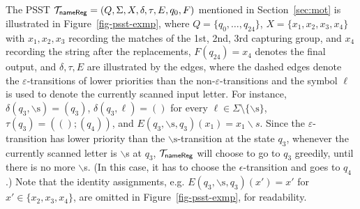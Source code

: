 \begin{example}
The PSST $\mathcal{T}_{\sf nameReg}=(Q, \Sigma, X, \delta, \tau, E,  q_{0}, F)$ mentioned in Section~\ref{sec:mot} is illustrated in Figure~\ref{fig-psst-exmp}, where $Q = \{q_0, \dots, q_{24}\}$, $X= \{x_1, x_2, x_3, x_4\}$ with $x_1, x_2, x_3$ recording the matches of the 1st, 2nd, 3rd capturing group, and $x_4$ recording the string after the replacements, $F(q_{24}) = x_4$ denotes the final output, and $\delta, \tau, E$ are illustrated by the edges, where the dashed edges denote the $\varepsilon$-transitions of lower priorities than the non-$\varepsilon$-transitions and the symbol $\ell$ is used to denote the currently scanned input letter. For instance, $\delta(q_3, \backslash\mbox{s}) = (q_3)$, $\delta(q_3, \ell) = ()$ for every $\ell \in \Sigma \setminus \{\backslash\mbox{s}\}$, $\tau(q_3) = ((); (q_4))$, and $E(q_3, \backslash\mbox{s}, q_3)(x_1) = x_1 \backslash s$. Since the $\varepsilon$-transition has lower priority than the $\backslash\mbox{s}$-transition at the state $q_3$, whenever the currently scanned letter is $\backslash$s at $q_3$,  $\mathcal{T}_{\sf nameReg}$ will choose to go to $q_3$ greedily, until there is no more $\backslash$s. (In this case, it has to choose the $\epsilon$-transition and goes to $q_4$.) Note that the identity assignments, e.g. $E(q_3, \backslash\mbox{s}, q_3)(x') = x'$ for $x' \in \{x_2, x_3, x_4\}$, are omitted in Figure~\ref{fig-psst-exmp}, for readability. 
\begin{figure}[ht]
\centering

\end{figure}
\end{example}
